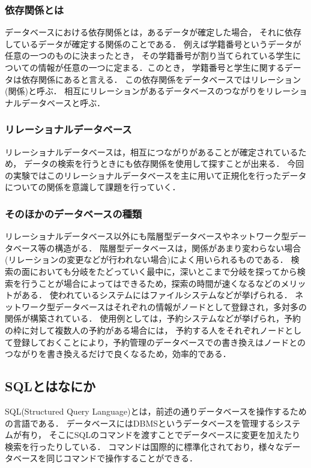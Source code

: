 \documentclass[a4paper,11pt]{ltjsarticle}
\begin{document}
\subsubsection{依存関係とは}
データベースにおける依存関係とは，あるデータが確定した場合，
それに依存しているデータが確定する関係のことである．
例えば学籍番号というデータが任意の一つのものに決まったとき，
その学籍番号が割り当てられている学生についての情報が任意の一つに定まる．このとき，
学籍番号と学生に関するデータは依存関係にあると言える．
この依存関係をデータベースではリレーション(関係)と呼ぶ．
相互にリレーションがあるデータベースのつながりをリレーショナルデータベースと呼ぶ．
\subsubsection{リレーショナルデータベース}
リレーショナルデータベースは，相互につながりがあることが確定されているため，
データの検索を行うときにも依存関係を使用して探すことが出来る．
今回の実験ではこのリレーショナルデータベースを主に用いて正規化を行ったデータについての関係を意識して課題を行っていく．
\subsubsection{そのほかのデータベースの種類}
リレーショナルデータベース以外にも階層型データベースやネットワーク型データベース等の構造がる．
階層型データベースは，関係があまり変わらない場合(リレーションの変更などが行われない場合)によく用いられるものである．
検索の面においても分岐をたどっていく最中に，深いとこまで分岐を探ってから検索を行うことが場合によってはできるため，探索の時間が速くなるなどのメリットがある．
使われているシステムにはファイルシステムなどが挙げられる．
ネットワーク型データベースはそれぞれの情報がノードとして登録され，多対多の関係が構築されている．
使用例としては，予約システムなどが挙げられ，予約の枠に対して複数人の予約がある場合には，
予約する人をそれぞれノードとして登録しておくことにより，予約管理のデータベースでの書き換えはノードとのつながりを書き換えるだけで良くなるため，効率的である．

\subsection{SQLとはなにか}
SQL(Structured Query Language)とは，前述の通りデータベースを操作するための言語である．
データベースにはDBMSというデータベースを管理するシステムが有り，
そこにSQLのコマンドを渡すことでデータベースに変更を加えたり検索を行ったりしている．
コマンドは国際的に標準化されており，様々なデータベースを同じコマンドで操作することができる．
\end{document}
